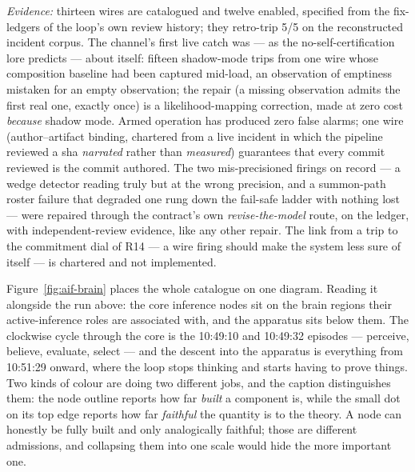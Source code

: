 \ifdefined\plopearlyoverview
\else
\emph{Evidence:} thirteen wires are catalogued and twelve enabled, specified from the fix-ledgers of the loop's own review history; they retro-trip 5/5 on the reconstructed incident corpus. The channel's first live catch was --- as the no-self-certification lore predicts --- about itself: fifteen shadow-mode trips from one wire whose composition baseline had been captured mid-load, an observation of emptiness mistaken for an empty observation; the repair (a missing observation admits the first real one, exactly once) is a likelihood-mapping correction, made at zero cost \emph{because} shadow mode. Armed operation has produced zero false alarms; one wire (author--artifact binding, chartered from a live incident in which the pipeline reviewed a sha \emph{narrated} rather than \emph{measured}) guarantees that every commit reviewed is the commit authored. The two mis-precisioned firings on record --- a wedge detector reading truly but at the wrong precision, and a summon-path roster failure that degraded one rung down the fail-safe ladder with nothing lost --- were repaired through the contract's own \emph{revise-the-model} route, on the ledger, with independent-review evidence, like any other repair. The link from a trip to the commitment dial of R14 --- a wire firing should make the system less sure of itself --- is chartered and not implemented.
\fi


\ifdefined\plopearlyoverview
\else
\bigskip

Figure~\ref{fig:aif-brain} places the whole catalogue on one diagram.  Reading
it alongside the run above: the core inference nodes sit on the brain regions
their active-inference roles are associated with, and the apparatus sits below
them.  The clockwise cycle through the core is the 10:49:10 and 10:49:32
episodes --- perceive, believe, evaluate, select --- and the descent into the
apparatus is everything from 10:51:29 onward, where the loop stops thinking and
starts having to prove things.  Two kinds of colour are doing two different
jobs, and the caption distinguishes them: the node outline reports how far
\emph{built} a component is, while the small dot on its top edge reports how far
\emph{faithful} the quantity is to the theory.  A node can honestly be fully
built and only analogically faithful; those are different admissions, and
collapsing them into one scale would hide the more important one.

